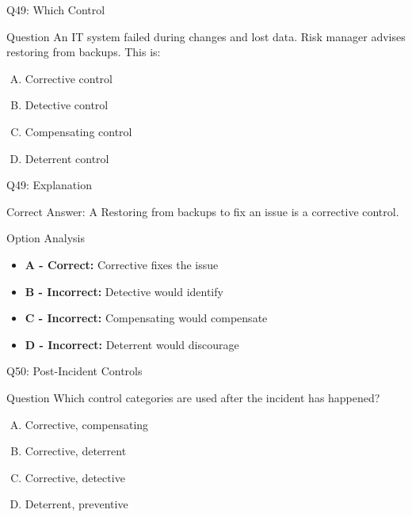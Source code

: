 \documentclass{beamer}
\begin{document}
	\begin{frame}{Q49: Which Control}
		\begin{block}{Question}
			An IT system failed during changes and lost data. Risk manager advises restoring from backups. This is:
		\end{block}
		\begin{enumerate}[(A)]
			\item Corrective control
			\item Detective control
			\item Compensating control
			\item Deterrent control
		\end{enumerate}
	\end{frame}
	
	\begin{frame}{Q49: Explanation}
		\begin{block}{Correct Answer: A}
			Restoring from backups to fix an issue is a corrective control.
		\end{block}
		\begin{block}{Option Analysis}
			\begin{itemize}
				\item \textbf{A - Correct:} Corrective fixes the issue
				\item \textbf{B - Incorrect:} Detective would identify
				\item \textbf{C - Incorrect:} Compensating would compensate
				\item \textbf{D - Incorrect:} Deterrent would discourage
			\end{itemize}
		\end{block}
	\end{frame}
	
	\begin{frame}{Q50: Post-Incident Controls}
		\begin{block}{Question}
			Which control categories are used after the incident has happened?
		\end{block}
		\begin{enumerate}[(A)]
			\item Corrective, compensating
			\item Corrective, deterrent
			\item Corrective, detective
			\item Deterrent, preventive
		\end{enumerate}
	\end{frame}
	
\end{document}
